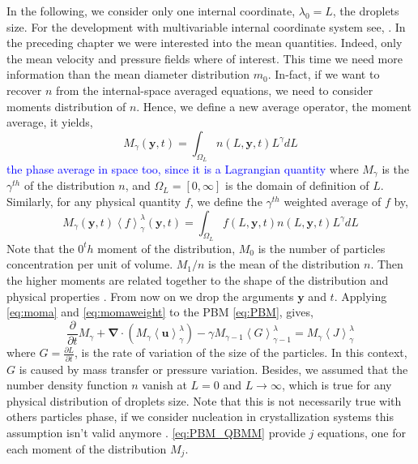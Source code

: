 In the following, we consider only one internal coordinate, $\lambda_0 = L$, the droplets size.
For the development with multivariable internal coordinate system see, \citet{marchisio2013computational}.
In the preceding chapter we were interested into the mean quantities.
Indeed, only the mean velocity and pressure fields where of interest. 
This time we need more information than the mean diameter distribution $m_0$. 
In-fact, if we want to recover $n$ from the internal-space averaged equations, we need to consider moments distribution of $n$. 
Hence, we define a new average operator, the moment average, it yields, 
\begin{equation}
    \label{eq:moma}
    M_{\gamma}(\bm{y},t) = \int_{\Omega_L} n(L,\bm{y},t) L^\gamma dL
\end{equation}
\textcolor{blue}{the phase average in space too, since it is a Lagrangian quantity}
where $M_{\gamma}$ is the $\gamma^{th}$ of the distribution $n$, and $\Omega_L=[0,\infty]$ is the domain of definition of $L$. 
Similarly, for any physical quantity $f$, we define the $\gamma^{th}$ weighted average of $f$ by,
\begin{equation}
    \label{eq:momaweight}
    M_{\gamma}(\bm{y},t)\left<f\right>^\lambda_\gamma(\bm{y},t)  = \int_{\Omega_L} f(L,\bm{y},t) n(L,\bm{y},t) L^\gamma dL
\end{equation}
Note that the $0^th$ moment of the distribution, $M_0$ is the number of particles concentration per unit of volume.
$M_1/n$ is the mean of the distribution $n$. 
Then the higher moments are related together to the shape of the distribution and physical properties \citep{KAMP20011363}. 
From now on we drop the arguments $\bm{y}$ and $t$. 
Applying \ref{eq:moma} and \ref{eq:momaweight} to the PBM \ref{eq:PBM}, gives,
\begin{equation}
    \label{eq:PBM_QBMM}
    \frac{\partial}{\partial t} M_{\gamma}  + \bm{\nabla} \cdot \left(M_{\gamma}\bm{\left<u\right>}^\lambda_\gamma\right)  -\gamma M_{\gamma-1}\left<G\right>^\lambda_{\gamma-1}  = M_{\gamma}\left<{J}\right>^\lambda_\gamma 
\end{equation}
where $G = \frac{\partial L}{\partial t}$, is the rate of variation of the size of the particles.
In this context, $G$ is caused by mass transfer or pressure variation. 
Besides, we assumed that the number density function $n$ vanish at $L=0$ and $L\rightarrow\infty$, which is true for any physical distribution of droplets size.
Note that this is not necessarily true with others particles phase, if we consider nucleation in crystallization systems this assumption isn't valid anymore \citep{randolph2012theory}. 
\ref{eq:PBM_QBMM} provide $j$ equations, one for each moment of the distribution $M_j$.

